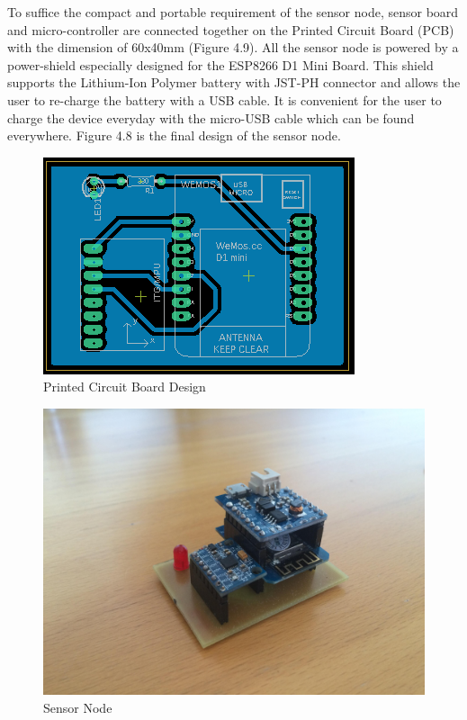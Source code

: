 \documentclass[letterpaper,12pt,titlepage,oneside,final]{book}
\let\origdoublepage\cleardoublepage
\newcommand{\clearemptydoublepage}{%
	\clearpage{\pagestyle{empty}\origdoublepage}}
\let\cleardoublepage\clearemptydoublepage
\begin{document}
To suffice the compact and portable requirement of the sensor node, sensor board and micro-controller are connected together on the Printed Circuit Board (PCB) with the dimension of 60x40mm (Figure 4.9). All the sensor node is powered by a power-shield especially designed for the ESP8266 D1 Mini Board. This shield supports the Lithium-Ion Polymer battery with JST-PH connector and allows the user to re-charge the battery with a USB cable. It is convenient for the user to charge the device everyday with the micro-USB cable which can be found everywhere. Figure 4.8 is the final design of the sensor node.
\cleardoublepage
\begin{figure}[h!]
	\centering
	\includegraphics[scale=2]{pcb_design}
	\caption{Printed Circuit Board Design}
\end{figure}
\vspace{2cm}
\begin{figure}[h!]
	\centering
	\includegraphics[scale=0.13]{final_product}
	\caption{Sensor Node}
\end{figure}
\end{document}
